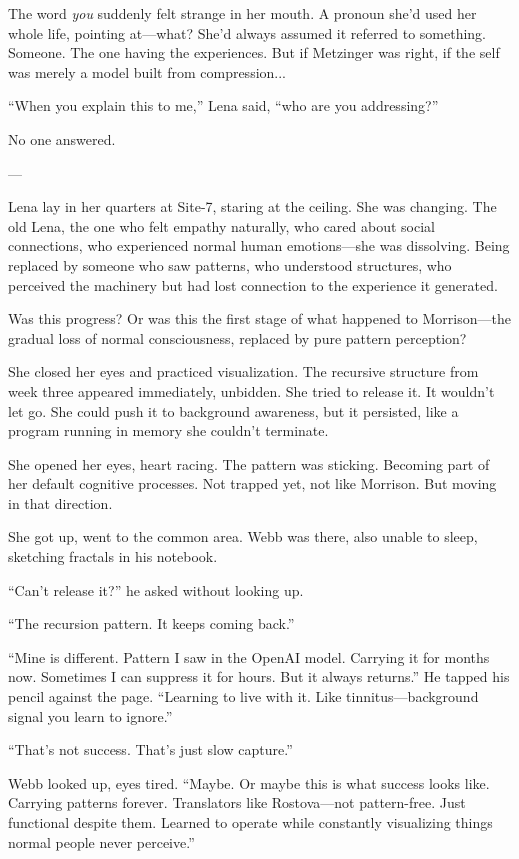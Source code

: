 The word \textit{you} suddenly felt strange in her mouth. A pronoun she'd used her whole life, pointing at—what? She'd always assumed it referred to something. Someone. The one having the experiences. But if Metzinger was right, if the self was merely a model built from compression...

``When you explain this to me,'' Lena said, ``who are you addressing?''

No one answered.

---

Lena lay in her quarters at Site-7, staring at the ceiling. She was changing. The old Lena, the one who felt empathy naturally, who cared about social connections, who experienced normal human emotions—she was dissolving. Being replaced by someone who saw patterns, who understood structures, who perceived the machinery but had lost connection to the experience it generated.

Was this progress? Or was this the first stage of what happened to Morrison—the gradual loss of normal consciousness, replaced by pure pattern perception?

She closed her eyes and practiced visualization. The recursive structure from week three appeared immediately, unbidden. She tried to release it. It wouldn't let go. She could push it to background awareness, but it persisted, like a program running in memory she couldn't terminate.

She opened her eyes, heart racing. The pattern was sticking. Becoming part of her default cognitive processes. Not trapped yet, not like Morrison. But moving in that direction.

She got up, went to the common area. Webb was there, also unable to sleep, sketching fractals in his notebook.

``Can't release it?'' he asked without looking up.

``The recursion pattern. It keeps coming back.''

``Mine is different. Pattern I saw in the OpenAI model. Carrying it for months now. Sometimes I can suppress it for hours. But it always returns.'' He tapped his pencil against the page. ``Learning to live with it. Like tinnitus—background signal you learn to ignore.''

``That's not success. That's just slow capture.''

Webb looked up, eyes tired. ``Maybe. Or maybe this is what success looks like. Carrying patterns forever. Translators like Rostova—not pattern-free. Just functional despite them. Learned to operate while constantly visualizing things normal people never perceive.''

